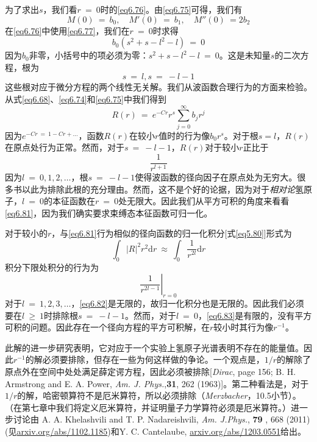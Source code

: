 \documentclass[12pt,a4paper,openany]{ctexbook}
\newcommand{\abs}[1]{\left| #1 \right|}
\newcommand{\dd}[1]{\mathrm{d} #1}
\begin{document}
\begin{flushleft}
为了求出$s$，我们看$r\ =\ 0$时的\eqref{eq6.76}。由\eqref{eq6.75}可得，我们有
\begin{equation}
    M(0)\ =\ b_0,\quad M'(0)\ =\ b_1,\quad M''(0)\ =2b_2 \label{eq6.77}
\end{equation}
在\eqref{eq6.76}中使用\eqref{eq6.77}，我们在$r\ =\ 0$时求得
\begin{equation}
    b_0(s^2+s-l^2-l)\ =\ 0 \label{eq6.78}
\end{equation}
因为$b_0$非零，小括号中的项必须为零：$s^2+s-l^2-l\ =\ 0$。这是未知量$s$的二次方程，根为
\begin{equation}
    s\ =\ l,s\ =\ -l-1 \label{eq6.79}
\end{equation}
这些根对应于微分方程的两个线性无关解。我们从波函数合理行为的方面来检验。从式\eqref{eq6.68}、\eqref{eq6.74}和\eqref{eq6.75}中我们得到
\begin{equation}
    R(r)\ =\ e^{-Cr}r^s\sum_{j=0}^{\infty}b_jr^j \label{eq6.80}
\end{equation}
因为$e^{-Cr\ =\ 1-Cr+\dots}$，函数$R(r)$在较小$r$值时的行为像$b_0r^s$。对于根$s=l$，$R(r)$在原点处行为正常。然而，对于$s\ =\ -l-1$，$R(r)$对于较小$r$正比于
\begin{equation}
    \frac{1}{r^{l+1}} \label{eq6.81}
\end{equation}
因为$l\ =\ 0,1,2,\dots$，根$s\ =\ -l-1$使得波函数的径向因子在原点处为无穷大。很多书以此为排除此根的充分理由。然而，这不是个好的论据，因为对于\textit{相对论}氢原子，$l\ =\ 0$的本征函数在$r\ =\ 0$处无限大。因此我们从平方可积的角度来看看\eqref{eq6.81}，因为我们确实要求束缚态本征函数可归一化。

对于较小的$r$，与\eqref{eq6.81}行为相似的径向函数的归一化积分[式\eqref{eq5.80}]形式为
\begin{equation}
    \int_0\abs{R}^2r^2\dd r\ \approx\ \int_0\frac{1}{r^{2l}}\dd r \label{eq6.82}
\end{equation}
积分下限处积分的行为为
\begin{equation}
    \left.\frac{1}{r^{2l-1}}\right|_{r=0} \label{eq6.83}
\end{equation}
对于$l\ =\ 1,2,3,\dots$，\eqref{eq6.82}是无限的，故归一化积分也是无限的。因此我们必须要在$l\ \geq\ 1$时排除根$s\ =\ -l-1$。然而，对于$l\ =\ 0$，\eqref{eq6.83}是有限的，没有平方可积的问题。因此存在一个径向方程的平方可积解，在$r$较小时其行为像$r^{-1}$。

此解的进一步研究表明，它对应于一个实验上氢原子光谱表明不存在的能量值。因此$r^{-1}$的解必须要排除，但存在一些为何这样做的争论。一个观点是，$1/r$的解除了原点外在空间中处处满足薛定谔方程，因此必须被排除[\textit{Dirac}, page 156; B. H. Armstrong and E. A. Power, \textit{Am. J. Phys.},\textbf{31}, 262 (1963)]。第二种看法是，对于$1/r$的解，哈密顿算符不是厄米算符，所以必须排除（\textit{Merzbacher}，10.5小节）。（在第七章中我们将定义厄米算符，并证明量子力学算符必须是厄米算符。）进一步讨论由 A. A. Khelashvili and T. P. Nadareishvili, \textit{Am. J.Phys.}, \textbf{79} , 668 (2011) (见\url{arxiv.org/abs/1102.1185})和Y. C. Cantelaube, \url{arxiv.org/abs/1203.0551}给出。


\end{flushleft}
\end{document}

